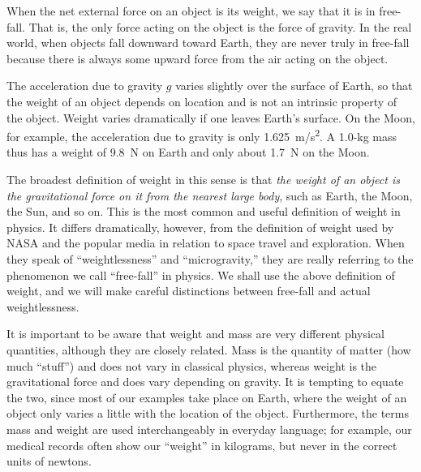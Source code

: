 \documentclass[../../main-ap-physics.tex]{subfiles}
\begin{document}
When the net external force on an object is its weight, we say that it is in \gls{free-fall}. That is, the only force acting on the object is the force of gravity. In the real world, when objects fall downward toward Earth, they are never truly in free-fall because there is always some upward force from the air acting on the object.

\vspace{1em}

The acceleration due to gravity $g$ varies slightly over the surface of Earth, so that the weight of an object depends on location and is not an intrinsic property of the object. Weight varies dramatically if one leaves Earth’s surface. On the Moon, for example, the acceleration due to gravity is only \SI{1.625}{m/s^2}. A 1.0-kg mass thus has a weight of \SI{9.8}{N} on Earth and only about \SI{1.7}{N} on the Moon.

\vspace{1em}

The broadest definition of weight in this sense is that \textit{the weight of an object is the gravitational force on it from the nearest large body}, such as Earth, the Moon, the Sun, and so on. This is the most common and useful definition of weight in physics. It differs dramatically, however, from the definition of weight used by NASA and the popular media in relation to space travel and exploration. When they speak of ``weightlessness'' and ``microgravity,'' they are really referring to the phenomenon we call ``free-fall'' in physics. We shall use the above definition of weight, and we will make careful distinctions between free-fall and actual weightlessness.

\vspace{1em}

It is important to be aware that weight and mass are very different physical quantities, although they are closely related. Mass is the quantity of matter (how much ``stuff'') and does not vary in classical physics, whereas weight is the gravitational force and does vary depending on gravity. It is tempting to equate the two, since most of our examples take place on Earth, where the weight of an object only varies a little with the location of the object. Furthermore, the terms mass and weight are used interchangeably in everyday language; for example, our medical records often show our ``weight'' in kilograms, but never in the correct units of newtons.
\end{document}
